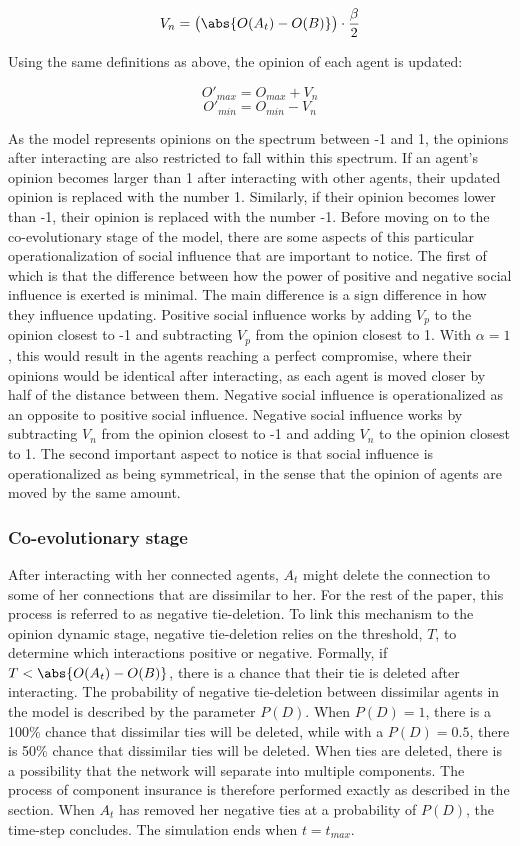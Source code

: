 \documentclass[11pt]{article}
\DeclarePairedDelimiter{\abs}\lvert\rvert
\begin{document}
$$V_n = \big(\abs{O(A_t) - O(B)}\big) \cdot \frac{\beta}{2}$$

Using the same definitions as above, the opinion of each agent is updated:

$$O'_{max} = O_{max} + V_n$$
$$O'_{min} = O_{min} - V_n$$

\noindent As the model represents opinions on the spectrum between -1 and 1, the opinions after interacting are also restricted to fall within this spectrum. If an agent's opinion becomes larger than 1 after interacting with other agents, their updated opinion is replaced with the number 1. Similarly, if their opinion becomes lower than -1, their opinion is replaced with the number -1. Before moving on to the co-evolutionary stage of the model, there are some aspects of this particular operationalization of social influence that are important to notice. 
The first of which is that the difference between how the power of positive and negative social influence is exerted is minimal. The main difference is a sign difference in how they influence updating. Positive social influence works by adding $V_p$ to the opinion closest to -1 and subtracting $V_p$ from the opinion closest to 1. With $\alpha = 1$, this would result in the agents reaching a perfect compromise, where their opinions would be identical after interacting, as each agent is moved closer by half of the distance between them. Negative social influence is operationalized as an opposite to positive social influence. Negative social influence works by subtracting $V_n$ from the opinion closest to -1 and adding $V_n$ to the opinion closest to 1. 
The second important aspect to notice is that social influence is operationalized as being symmetrical, in the sense that the opinion of agents are moved by the same amount. 

\subsubsection{Co-evolutionary stage}
After interacting with her connected agents, $A_t$ might delete the connection to some of her connections that are dissimilar to her. For the rest of the paper, this process is referred to as negative tie-deletion. 
To link this mechanism to the opinion dynamic stage, negative tie-deletion relies on the threshold, $T$, to determine which interactions positive or negative. Formally, if $T < \abs{O(A_t) - O(B)}$, there is a chance that their tie is deleted after interacting. The probability of negative tie-deletion between dissimilar agents in the model is described by the parameter $P(D)$.
When $P(D) = 1$, there is a 100\% chance that dissimilar ties will be deleted, while with a $P(D) = 0.5$, there is 50\% chance that dissimilar ties will be deleted. 
When ties are deleted, there is a possibility that the network will separate into multiple components. The process of component insurance is therefore performed exactly as described in the \textit{} section. 
When $A_t$ has removed her negative ties at a probability of $P(D)$, the time-step concludes. The simulation ends when $t = t_{max}$.
\end{document}
